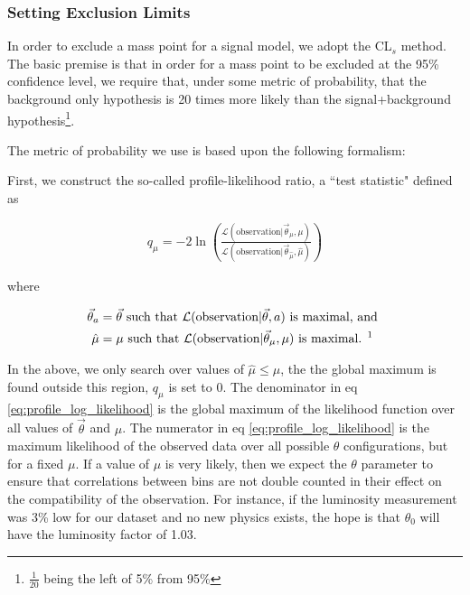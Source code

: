     \subsubsection{Setting Exclusion Limits}

      In order to exclude a mass point for a signal model, we adopt the CL$_s$ method. The basic premise is that in order for a mass point to be excluded at the 95\% confidence level, we require that, under some metric of probability, that the background only hypothesis is 20 times more likely than the signal+background hypothesis\footnote{$\frac{1}{20}$ being the left of 5\% from 95\%}.

      The metric of probability we use is based upon the following formalism: 

      First, we construct the so-called profile-likelihood ratio, a ``test statistic" defined as

      \begin{align} \label{eq:profile_log_likelihood}
        q_\mu = -2 \ln \left( \frac{\mathcal{L}(\text{observation} | \vec{\theta}_{\mu}, \mu)}{\mathcal{L}(\text{observation} | \vec{\theta}_{\hat{\mu}}, \hat{\mu})} \right)
      \end{align}

      where

      \begin{align*}
        \vec{\theta}_a &= \vec{\theta} \text{ such that } \mathcal{L}(\text{observation} | \vec{\theta}, a) \text{ is maximal, and } \\
        \hat{\mu} &= \mu \text{ such that } \mathcal{L}(\text{observation} | \vec{\theta}_\mu, \mu) \text{ is maximal. \footnotemark{} }
      \end{align*}
      
       In the above, we only search over values of $\hat{\mu} \le \mu$, the the global maximum is found outside this region, $q_\mu$ is set to 0. The denominator in eq \ref{eq:profile_log_likelihood} is the global maximum of the likelihood function over all values of $\vec{\theta}$ and $\mu$. The numerator in eq \ref{eq:profile_log_likelihood} is the maximum likelihood of the observed data over all possible $\theta$ configurations, but for a fixed $\mu$. If a value of $\mu$ is very likely, then we expect the $\theta$ parameter to ensure that correlations between bins are not double counted in their effect on the compatibility of the observation. For instance, if the luminosity measurement was 3\% low for our dataset and no new physics exists, the hope is that $\theta_0$ will have the luminosity factor of 1.03.


